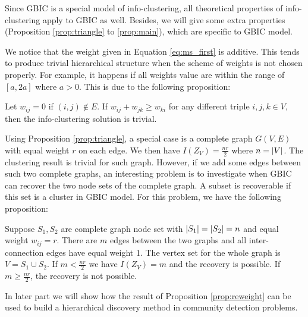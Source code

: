 Since GBIC is a special model of info-clustering, all theoretical properties of info-clustering apply to GBIC as well. Besides, we will give some extra properties (Proposition \ref{prop:triangle} to \ref{prop:main}), which are specific to GBIC model.

We notice that the weight given in Equation \ref{eq:ms_first} is additive. This tends to produce trivial hierarchical structure when the scheme of weights is not chosen properly.
For example, it happens if all weights value are within the range of $[a, 2a]$ where $a>0$. This is due to the following proposition:

\begin{proposition}\label{prop:triangle}
Let $w_{ij}=0$ if $(i,j)\not\in E$. If $w_{ij} + w_{jk} \geq w_{ki}$ for any different triple $i, j, k \in V$, then the info-clustering solution is trivial\footnotemark.
\end{proposition}

Using Proposition \ref{prop:triangle}, a special case is a complete graph $G(V,E)$ with equal weight $r$ on each edge. We then have $I(Z_{V})=\frac{nr}{2}$ where $n=\lvert V\rvert$. The clustering result is trivial for such graph. However, if we add some edges between such two complete graphs, an interesting problem is to investigate when GBIC can recover the two node sets of the complete graph. A subset is recoverable if this set is a cluster in GBIC model.
For this problem, we have the following proposition:

\begin{proposition}\label{prop:reweight}
Suppose $S_1, S_2 $ are complete graph node set with $\lvert S_1\rvert=\lvert S_2\rvert=n$ and equal weight $w_{ij}=r$. There are $m$ edges between the two graphs and all inter-connection edges have equal weight 1. The vertex set for the whole graph is $V=S_1\cup S_2$. If $m <\frac{nr}{2}$  we have
$I(Z_V) = 
m$ and the recovery is possible. If $m\geq \frac{nr}{2}$, the recovery is not possible.
\end{proposition}

In later part we will show how the result of Proposition \ref{prop:reweight} can be used to build a hierarchical discovery method in community detection problems.

